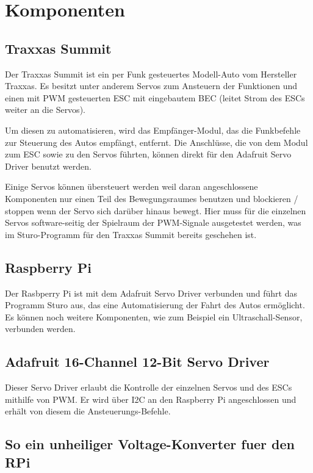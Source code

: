 \documentclass[a4paper,10pt]{scrartcl}
\begin{document}
\section{Komponenten}

  \subsection{Traxxas Summit}

    Der Traxxas Summit ist ein per Funk gesteuertes Modell-Auto vom Hersteller Traxxas.
    Es besitzt unter anderem Servos zum Ansteuern der Funktionen und einen mit PWM gesteuerten ESC
    mit eingebautem BEC (leitet Strom des ESCs weiter an die Servos).

    Um diesen zu automatisieren, wird das Empfänger-Modul, das die Funkbefehle zur Steuerung des
    Autos empfängt, entfernt.
    Die Anschlüsse, die von dem Modul zum ESC sowie zu den Servos führten, können direkt für den
    Adafruit Servo Driver benutzt werden.

    Einige Servos können übersteuert werden weil daran angeschlossene Komponenten nur einen Teil
    des Bewegungsraumes benutzen und blockieren / stoppen wenn der Servo sich darüber hinaus
    bewegt.
    Hier muss für die einzelnen Servos software-seitig der Spielraum der PWM-Signale ausgetestet
    werden, was im Sturo-Programm für den Traxxas Summit bereits geschehen ist.

  \subsection{Raspberry Pi}

    Der Rasbperry Pi ist mit dem Adafruit Servo Driver verbunden und führt das Programm Sturo aus,
    das eine Automatisierung der Fahrt des Autos ermöglicht.
    Es können noch weitere Komponenten, wie zum Beispiel ein Ultraschall-Sensor, verbunden werden.

  \subsection{Adafruit 16-Channel 12-Bit Servo Driver}

    Dieser Servo Driver \cite{adafruitmod} erlaubt die Kontrolle der einzelnen
    Servos und des ESCs mithilfe von PWM.
    Er wird über I2C an den Raspberry Pi angeschlossen und erhält von diesem die
    Ansteuerungs-Befehle.

  \subsection{So ein unheiliger Voltage-Konverter fuer den RPi}
\end{document}
